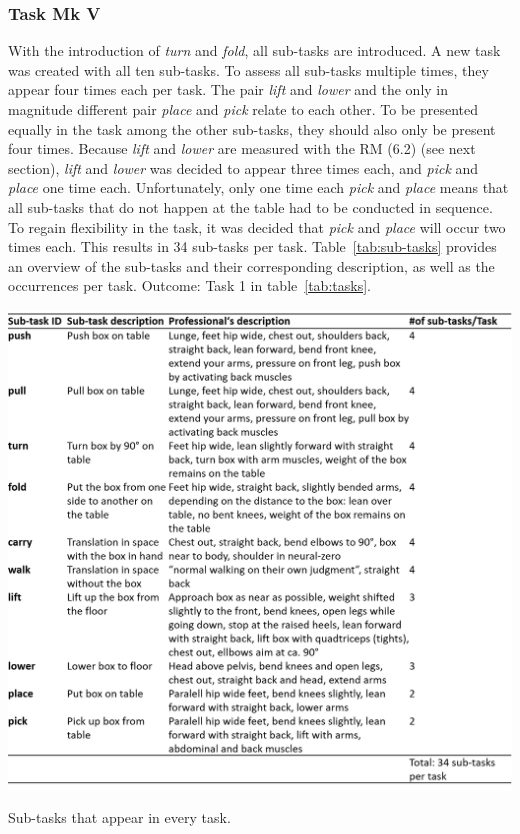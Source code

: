 \subsubsection{Task Mk V}
With the introduction of \textit{turn} and \textit{fold}, all sub-tasks are introduced. A new task was created with all ten sub-tasks. To assess all sub-tasks multiple times, they appear four times each per task. The pair \textit{lift} and \textit{lower} and the only in magnitude different pair \textit{place} and \textit{pick} relate to each other. To be presented equally in the task among the other sub-tasks, they should also only be present four times. Because \textit{lift} and \textit{lower} are measured with the RM (6.2) (see next section), \textit{lift} and \textit{lower} was decided to appear three times each, and \textit{pick} and \textit{place} one time each. Unfortunately, only one time each \textit{pick} and \textit{place} means that all sub-tasks that do not happen at the table had to be conducted in sequence. To regain flexibility in the task, it was decided that \textit{pick} and \textit{place} will occur two times each. This results in 34 sub-tasks per task. Table~\ref{tab:sub-tasks} provides an overview of the sub-tasks and their corresponding description, as well as the occurrences per task.
Outcome: Task 1 in table~\ref{tab:tasks}.

\begin{table}[H]
	\centering
	\includegraphics[width=\textwidth]{figures/sub_tasks_definition.png}
	\caption[Description of sub-tasks]{Sub-tasks that appear in every task.}
	\label{tab:sub-tasks}
\end{table}

